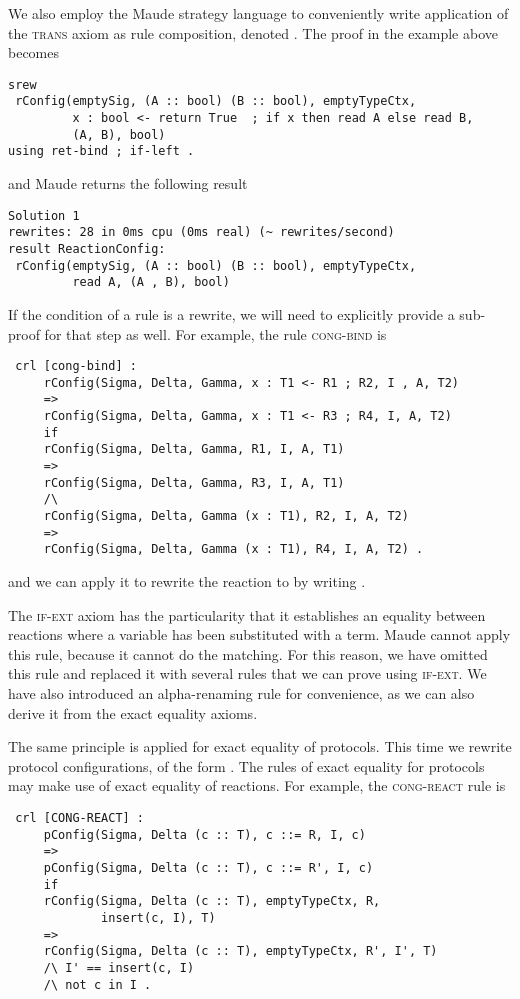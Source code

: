 We also employ the Maude strategy language to conveniently write 
application of the \textsc{trans} axiom as rule composition, denoted \code{;}. The proof in the example above becomes
\begin{lstlisting}
srew 
 rConfig(emptySig, (A :: bool) (B :: bool), emptyTypeCtx, 
         x : bool <- return True  ; if x then read A else read B, 
         (A, B), bool)
using ret-bind ; if-left .
\end{lstlisting}
\noindent and Maude returns the following result
\begin{lstlisting}
Solution 1
rewrites: 28 in 0ms cpu (0ms real) (~ rewrites/second)
result ReactionConfig: 
 rConfig(emptySig, (A :: bool) (B :: bool), emptyTypeCtx, 
         read A, (A , B), bool)
\end{lstlisting}

If the condition of a rule is a rewrite, we will need to explicitly
provide a sub-proof for that step as well.
For example, the rule \textsc{cong-bind} is
\begin{lstlisting}
 crl [cong-bind] :
     rConfig(Sigma, Delta, Gamma, x : T1 <- R1 ; R2, I , A, T2) 
     => 
     rConfig(Sigma, Delta, Gamma, x : T1 <- R3 ; R4, I, A, T2) 
     if
     rConfig(Sigma, Delta, Gamma, R1, I, A, T1)  
     => 
     rConfig(Sigma, Delta, Gamma, R3, I, A, T1) 
     /\
     rConfig(Sigma, Delta, Gamma (x : T1), R2, I, A, T2)
     => 
     rConfig(Sigma, Delta, Gamma (x : T1), R4, I, A, T2) .
\end{lstlisting}
\noindent and we can apply it to rewrite the reaction
to
by writing
.

The \textsc{if-ext} axiom has the particularity that 
it establishes an equality between reactions 
where a variable has been substituted with a term.
Maude cannot apply this rule, because it cannot do the matching.
For this reason, we have omitted this rule and replaced it with
several rules that we can prove using \textsc{if-ext}. We have also
introduced an alpha-renaming rule for convenience, as we can also derive it
from the exact equality axioms.

The same principle is applied for exact equality of protocols.
This time we rewrite protocol configurations, of the form
.
The rules of exact equality for protocols may make use of
exact equality of reactions. For example, the \textsc{cong-react} rule
is
\begin{lstlisting}
 crl [CONG-REACT] : 
     pConfig(Sigma, Delta (c :: T), c ::= R, I, c) 
     =>
     pConfig(Sigma, Delta (c :: T), c ::= R', I, c)
     if
     rConfig(Sigma, Delta (c :: T), emptyTypeCtx, R, 
             insert(c, I), T)
     =>
     rConfig(Sigma, Delta (c :: T), emptyTypeCtx, R', I', T) 
     /\ I' == insert(c, I)
     /\ not c in I .
\end{lstlisting}

